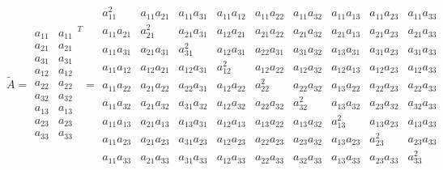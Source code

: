 \documentclass{article}
\begin{document}
\begin{equation*}
\tilde{A}=%
\begin{array}{c}
a_{11} \\ 
a_{21} \\ 
a_{31} \\ 
a_{12} \\ 
a_{22} \\ 
a_{32} \\ 
a_{13} \\ 
a_{23} \\ 
a_{33}%
\end{array}%
\begin{array}{c}
a_{11} \\ 
a_{21} \\ 
a_{31} \\ 
a_{12} \\ 
a_{22} \\ 
a_{32} \\ 
a_{13} \\ 
a_{23} \\ 
a_{33}%
\end{array}%
^{T}=%
\begin{array}{ccccccccc}
a_{11}^{2} & a_{11}a_{21} & a_{11}a_{31} & a_{11}a_{12} & a_{11}a_{22} & 
a_{11}a_{32} & a_{11}a_{13} & a_{11}a_{23} & a_{11}a_{33} \\ 
a_{11}a_{21} & a_{21}^{2} & a_{21}a_{31} & a_{12}a_{21} & a_{21}a_{22} & 
a_{21}a_{32} & a_{21}a_{13} & a_{21}a_{23} & a_{21}a_{33} \\ 
a_{11}a_{31} & a_{21}a_{31} & a_{31}^{2} & a_{12}a_{31} & a_{22}a_{31} & 
a_{31}a_{32} & a_{13}a_{31} & a_{31}a_{23} & a_{31}a_{33} \\ 
a_{11}a_{12} & a_{12}a_{21} & a_{12}a_{31} & a_{12}^{2} & a_{12}a_{22} & 
a_{12}a_{32} & a_{12}a_{13} & a_{12}a_{23} & a_{12}a_{33} \\ 
a_{11}a_{22} & a_{21}a_{22} & a_{22}a_{31} & a_{12}a_{22} & a_{22}^{2} & 
a_{22}a_{32} & a_{13}a_{22} & a_{22}a_{23} & a_{22}a_{33} \\ 
a_{11}a_{32} & a_{21}a_{32} & a_{31}a_{32} & a_{12}a_{32} & a_{22}a_{32} & 
a_{32}^{2} & a_{13}a_{32} & a_{23}a_{32} & a_{32}a_{33} \\ 
a_{11}a_{13} & a_{21}a_{13} & a_{13}a_{31} & a_{12}a_{13} & a_{13}a_{22} & 
a_{13}a_{32} & a_{13}^{2} & a_{13}a_{23} & a_{13}a_{33} \\ 
a_{11}a_{23} & a_{21}a_{23} & a_{31}a_{23} & a_{12}a_{23} & a_{22}a_{23} & 
a_{23}a_{32} & a_{13}a_{23} & a_{23}^{2} & a_{23}a_{33} \\ 
a_{11}a_{33} & a_{21}a_{33} & a_{31}a_{33} & a_{12}a_{33} & a_{22}a_{33} & 
a_{32}a_{33} & a_{13}a_{33} & a_{23}a_{33} & a_{33}^{2}%
\end{array}%
\end{equation*}%
\end{document}
